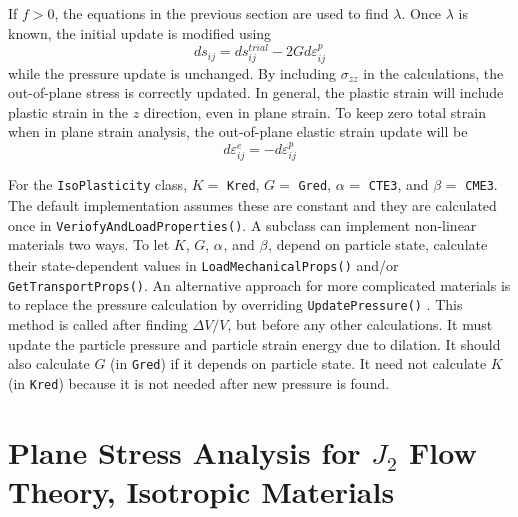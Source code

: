 \documentclass[11pt]{book}
\def\a#1{\alpha_{#1}}
\def\b#1{\beta_{#1}}
\def\code#1{{\small\tt #1}}
\def\s#1{\sigma_{#1}}
\begin{document}
If $f>0$, the equations in the previous section are used to find $\lambda$. Once $\lambda$ is known, the initial update is modified using
\begin{equation}
     ds_{ij} = ds_{ij}^{trial} - 2G d\varepsilon_{ij}^{p} 
\end{equation}
while the pressure update is unchanged.
By including $\s{zz}$ in the calculations, the out-of-plane stress is correctly updated. In general, the plastic strain will include plastic strain in the $z$ direction, even in plane strain. To keep zero total strain when in plane strain analysis, the out-of-plane elastic strain update will be
\begin{equation}
       d\varepsilon_{ij}^{e} = -d\varepsilon_{ij}^{p}  
\end{equation}

For the \code{IsoPlasticity} class, $K=$ \code{Kred}, $G=$ \code{Gred}, $\a{}=$ \code{CTE3}, and $\b{}=$ \code{CME3}. The default implementation assumes these are constant and they are calculated once in \code{VeriofyAndLoadProperties()}. A subclass can implement non-linear materials two ways. To let $K$, $G$, $\a{}$, and $\b{}$, depend on particle state, calculate their state-dependent values in \code{LoadMechanicalProps()} and/or \code{GetTransportProps()}. An alternative approach for more complicated materials is to replace the pressure calculation by overriding \code{UpdatePressure()} . This method is called after finding ${\Delta V/V}$, but before any other calculations. It must update the particle pressure and particle strain energy due to dilation. It should also calculate $G$ (in \code{Gred}) if it depends on particle state. It need not calculate $K$ (in \code{Kred}) because it is not needed after new pressure is found. 

\section{Plane Stress Analysis for $J_2$ Flow Theory, Isotropic Materials\label{J2PStress}}
\end{document}
